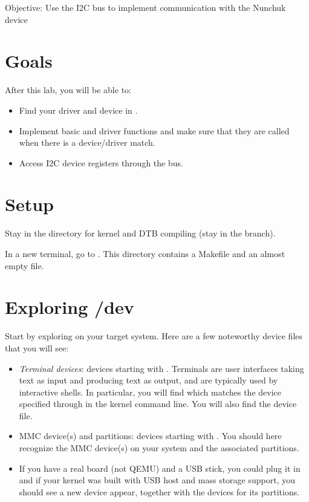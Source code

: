 {Objective: Use the I2C bus to implement communication with the Nunchuk device}

\section{Goals}

After this lab, you will be able to:
\begin{itemize}
\item Find your driver and device in .
\item Implement basic  and  driver
  functions and make sure that they are called when there is a
  device/driver match.
\item Access I2C device registers through the bus.
\end{itemize}

\section{Setup}

Stay in the  directory for kernel and DTB
compiling (stay in the  branch).

In a new terminal, go to
.  This directory
contains a Makefile and an almost empty  file.

\section{Exploring /dev}

Start by exploring  on your target system. Here are a few
noteworthy device files that you will see:

\begin{itemize}
 \item {\em Terminal devices}: devices starting with .
       Terminals are user interfaces taking text as
       input and producing text as output, and are typically used by
       interactive shells. In particular, you will find
        which matches the device specified through
        in the kernel command line. You will also find
       the {\tt \ttyname} device file.
 \item {MMC device(s) and partitions}: devices starting with
       . You should here recognize the MMC device(s)
       on your system and the associated partitions.
 \item If you have a real board (not QEMU) and a USB stick, you could
       plug it in and if your kernel was built with USB host and mass
       storage support, you should see a new  device appear,
       together with the  devices for its partitions.
\end{itemize}


